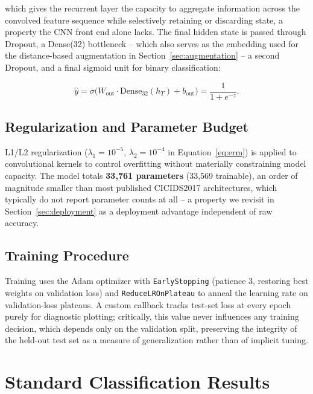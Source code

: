 \documentclass[11pt]{article}
\begin{document}
which gives the recurrent layer the capacity to aggregate information across the convolved feature
sequence while selectively retaining or discarding state, a property the CNN front end alone lacks.
The final hidden state is passed through Dropout, a Dense(32) bottleneck -- which also serves as the
embedding used for the distance-based augmentation in Section~\ref{sec:augmentation} -- a second
Dropout, and a final sigmoid unit for binary classification:

\begin{equation}
\hat{y} = \sigma\big(W_{\text{out}} \cdot \text{Dense}_{32}(h_T) + b_{\text{out}}\big) = \frac{1}{1 + e^{-z}}.
\end{equation}

\subsection{Regularization and Parameter Budget}

L1/L2 regularization ($\lambda_1 = 10^{-5}$, $\lambda_2 = 10^{-4}$ in Equation~\ref{eq:erm}) is
applied to convolutional kernels to control overfitting without materially constraining model
capacity. The model totals \textbf{33{,}761 parameters} (33{,}569 trainable), an order of magnitude
smaller than most published CICIDS2017 architectures, which typically do not report parameter
counts at all -- a property we revisit in Section~\ref{sec:deployment} as a deployment advantage
independent of raw accuracy.

\subsection{Training Procedure}

Training uses the Adam optimizer with \texttt{EarlyStopping} (patience 3, restoring best weights on
validation loss) and \texttt{ReduceLROnPlateau} to anneal the learning rate on validation-loss
plateaus. A custom callback tracks test-set loss at every epoch purely for diagnostic plotting;
critically, this value never influences any training decision, which depends only on the validation
split, preserving the integrity of the held-out test set as a measure of generalization rather than
of implicit tuning.

\section{Standard Classification Results}
\label{sec:standard-results}
\end{document}
